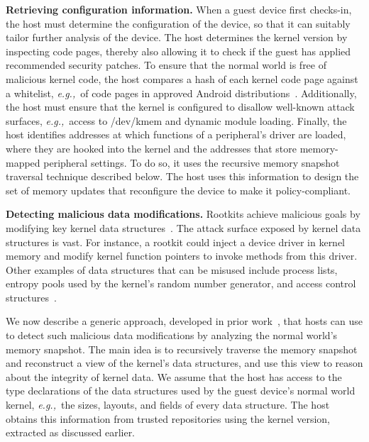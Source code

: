 \documentclass[pageno]{sig-alternate-05-2015}
\newcommand{\emphitem}[1]{\textbf{#1}}
\newcommand*\circled[1]{\tikz[baseline=(char.base)]{
            \node[shape=circle,draw,inner sep=0.5pt] (char) {#1};}}
\newcounter{myctr}
\newenvironment{mylist}{\begin{list}{\textbf{\circled{\arabic{myctr}}}}
{\usecounter{myctr}
\setlength{\topsep}{1mm}\setlength{\itemsep}{0.5mm}
\setlength{\parsep}{0.5mm}
\setlength{\listparindent}{\parindent} %
\setlength{\itemindent}{0mm}\setlength{\partopsep}{0mm}
\setlength{\labelwidth}{-2mm}
\setlength{\leftmargin}{0mm}}}{\end{list}}
\newcommand{\eg}{\textit{e.g.,}}
\newcommand{\addtext}[2]{#2}
\begin{document}
\begin{mylist}
%
\item \emphitem{Retrieving configuration information.} 
\addtext{Task 2}{When a guest device first checks-in, the host must determine
the configuration of the device, so that it can suitably tailor further
analysis of the device. The host determines the kernel version by inspecting
code pages, thereby also allowing it to check if the guest has applied
recommended security patches. To ensure that the normal world is free of
malicious kernel code, the host compares a hash of each kernel code page
against a whitelist, \eg~of code pages in approved Android
distributions~\cite{patagonix:sec08,secvisor:sosp07}.  Additionally, the host
must ensure that the kernel is configured to disallow well-known attack
surfaces, \eg~access to \textsf{/dev/kmem} and dynamic module loading. Finally,
the host identifies addresses at which functions of a peripheral's driver are
loaded, where they are hooked into the kernel and the addresses that store
memory-mapped peripheral settings. To do so, it uses the recursive memory
snapshot traversal technique described below. The host uses this information to
design the set of memory updates that reconfigure the device to make it
policy-compliant.}
%
\item \emphitem{Detecting malicious data modifications.} Rootkits achieve
malicious goals by modifying key kernel data
structures~\cite{sbcfi:ccs07,shadows:oakland07,specmon:usenix06}.  The attack
surface exposed by kernel data structures is vast.  For instance, a rootkit
could inject a device driver in kernel memory and modify kernel function
pointers to invoke methods from this driver. Other examples of data structures
that can be misused include process lists, entropy pools used by the kernel's
random number generator, and access control
structures~\cite{shadows:oakland07,specmon:usenix06}.
%
\end{mylist}

We now describe a generic approach, developed in prior
work~\cite{sbcfi:ccs07,gib:tdsc11,kop:ccs09,kop:sec12,osck:asplos11}, that
hosts can use to detect such malicious data modifications by analyzing the
normal world's memory snapshot. The main idea is to recursively traverse the
memory snapshot and reconstruct a view of the kernel's data structures, and use
this view to reason about the integrity of kernel data. We assume that the host
has access to the type declarations of the data structures used by the guest
device's normal world kernel, \eg~the sizes, layouts, and fields of every data
structure. The host obtains this information from trusted repositories using
the kernel version, extracted as discussed earlier.
\end{document}
